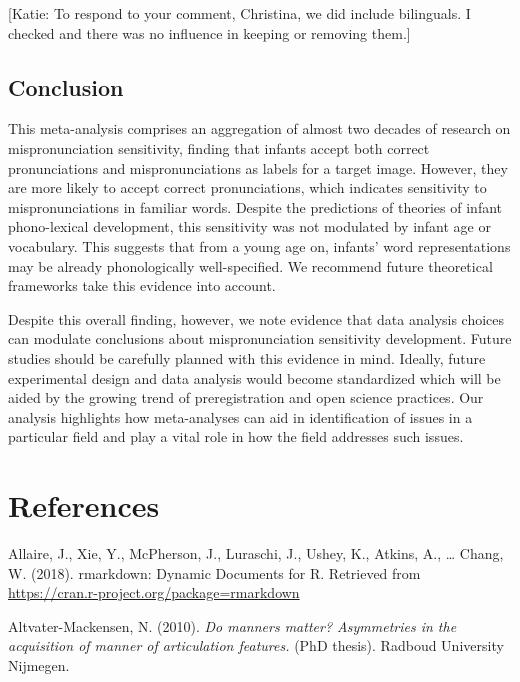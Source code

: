 \documentclass[man]{apa6}
\theoremstyle{definition}
\theoremstyle{definition}
\theoremstyle{definition}
\theoremstyle{remark}
\begin{document}
{[}Katie: To respond to your comment, Christina, we did include
bilinguals. I checked and there was no influence in keeping or removing
them.{]}

\subsection{Conclusion}\label{conclusion}

This meta-analysis comprises an aggregation of almost two decades of
research on mispronunciation sensitivity, finding that infants accept
both correct pronunciations and mispronunciations as labels for a target
image. However, they are more likely to accept correct pronunciations,
which indicates sensitivity to mispronunciations in familiar words.
Despite the predictions of theories of infant phono-lexical development,
this sensitivity was not modulated by infant age or vocabulary. This
suggests that from a young age on, infants' word representations may be
already phonologically well-specified. We recommend future theoretical
frameworks take this evidence into account.

Despite this overall finding, however, we note evidence that data
analysis choices can modulate conclusions about mispronunciation
sensitivity development. Future studies should be carefully planned with
this evidence in mind. Ideally, future experimental design and data
analysis would become standardized which will be aided by the growing
trend of preregistration and open science practices. Our analysis
highlights how meta-analyses can aid in identification of issues in a
particular field and play a vital role in how the field addresses such
issues.

\newpage

\section{References}\label{references}

\begingroup
\setlength{\parindent}{-0.5in} \setlength{\leftskip}{0.5in}

\hypertarget{refs}{}
\hypertarget{ref-RMarkdown}{}
Allaire, J., Xie, Y., McPherson, J., Luraschi, J., Ushey, K., Atkins,
A., \ldots{} Chang, W. (2018). rmarkdown: Dynamic Documents for R.
Retrieved from \url{https://cran.r-project.org/package=rmarkdown}

\hypertarget{ref-Altvater2010}{}
Altvater-Mackensen, N. (2010). \emph{Do manners matter? Asymmetries in
the acquisition of manner of articulation features.} (PhD thesis).
Radboud University Nijmegen.
\end{document}
